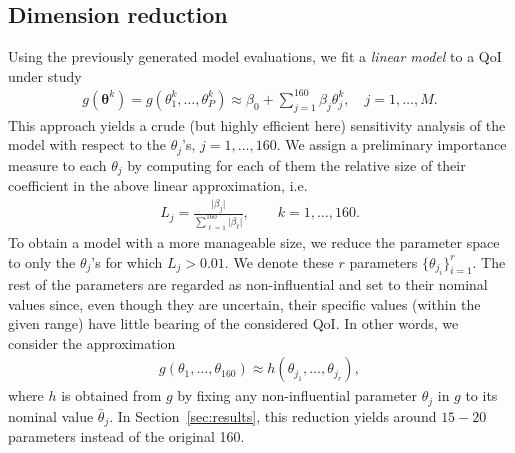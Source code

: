 \subsection{Dimension reduction}
Using the previously generated model evaluations, we fit a {\sl linear model} to a QoI under study
\begin{eqnarray}
g(\boldsymbol\theta^k) = g(\theta_1^k, \dots, \theta_P^k) \approx \beta_0 + \sum\limits_{j=1}^{160} \beta_j \theta_j^k, \quad j=1, \dots, M. \label{lr}
\end{eqnarray}
This approach yields a crude (but highly efficient here) sensitivity analysis of the model with respect to the $\theta_j$'s, $j=1,\dots, 160$. We assign a preliminary importance measure to each $\theta_j$ by computing for each of them the relative size of their coefficient in the above linear approximation, i.e.
\begin{eqnarray*}
L_j = \frac{\vert \beta_j \vert}{\sum\limits_{\ell=1}^{160} \vert \beta_\ell \vert}, \qquad k=1,\dots,160.
\end{eqnarray*}
To obtain a model with a more manageable size, we reduce the parameter space to only the $\theta_j$'s for which $L_j>0.01$. We denote these $r$ parameters $\{ \theta_{j_i}\}_{i=1}^r$. The rest of the parameters are regarded as non-influential and set to their nominal values since, even though they are uncertain, their specific values (within the given range) have little bearing of the considered QoI. In other words, we consider the approximation 
\begin{eqnarray}
g(\theta_1, \dots, \theta_{160}) \approx h(\theta_{j_1}, \dots, \theta_{j_r}), \label{reddim}
\end{eqnarray}
where $h$ is obtained from $g$ by fixing any non-influential parameter $\theta_j$ in $g$  to its nominal value $\bar\theta_j$. In Section~\ref{sec:results}, this reduction yields around $15-20$ parameters instead of the original 160. 



